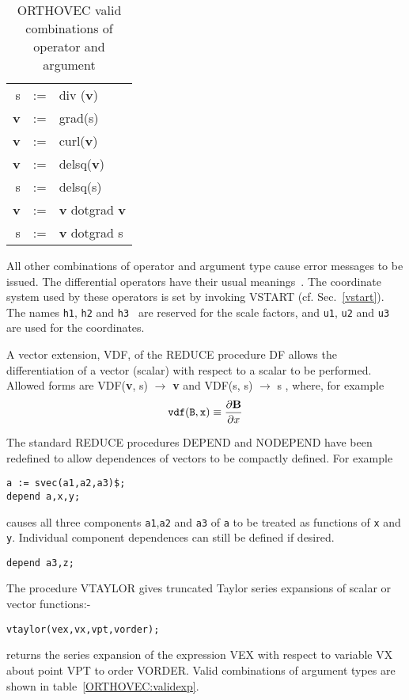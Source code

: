 \begin{table}
\begin{center}
\begin{tabular}{rcl}
s & := & div ({\bf v})  \\
{\bf v} & := & grad(s) \\
{\bf v} & := & curl({\bf v})  \\
{\bf v} & := & delsq({\bf v}) \\
 s  & := & delsq(s) \\
{\bf v} & := & {\bf v}  dotgrad {\bf v}  \\
 s & := & {\bf v}  dotgrad  s
\end{tabular}
\end{center}
\caption{ORTHOVEC valid combinations of operator and argument}\label{vvecttable}
\end{table}

All other combinations of operator and argument type cause error
messages to be issued.  The differential operators have their usual
meanings~\cite{Speigel:59}.  The coordinate system used by these operators is
set by invoking  VSTART (cf. Sec.~\ref{vstart}).  The names {\tt h1},
{\tt h2}  and {\tt h3 } are
reserved for the scale factors, and {\tt u1}, {\tt u2} and {\tt u3} are
used for the coordinates.

A vector extension, VDF, of the REDUCE procedure DF allows the
differentiation of a vector (scalar) with respect to a scalar to be
performed.  Allowed forms are 
VDF({\bf v}, s)  $\rightarrow$  {\bf v}   and
VDF(s, s)  $\rightarrow$   s ,
where, for example\\
\begin{eqnarray*}
{\tt vdf( B,x)} \equiv \frac{\partial {\bf B}}{\partial x}
\end{eqnarray*}

The standard REDUCE procedures DEPEND and NODEPEND have been redefined
to allow dependences of vectors to be compactly
defined.  For example  
\begin{verbatim}
a := svec(a1,a2,a3)$;
depend a,x,y;
\end{verbatim}
causes all three components {\tt a1},{\tt a2} and {\tt a3} of {\tt a}
to be treated as functions of {\tt x} and {\tt y}.
Individual component dependences can still be defined if desired.
\begin{verbatim}
depend a3,z;
\end{verbatim}

The procedure VTAYLOR gives truncated Taylor series expansions of scalar
or vector functions:- 
\begin{verbatim}
vtaylor(vex,vx,vpt,vorder);
\end{verbatim}
returns the series expansion of the expression
VEX  with respect to variable VX 
about point VPT  to order VORDER.  Valid
combinations of argument types are shown in table~\ref{ORTHOVEC:validexp}. \\

